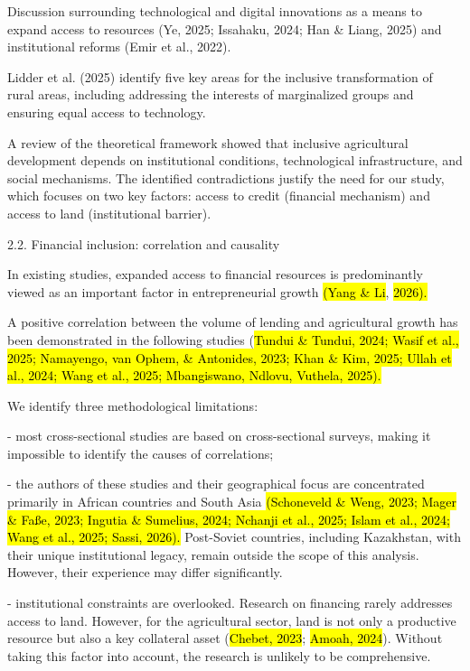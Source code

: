 Discussion surrounding technological and digital innovations as a means
to expand access to resources (Ye, 2025; Issahaku, 2024; Han \& Liang,
2025) and institutional reforms (Emir et al., 2022).

Lidder et al. (2025) identify five key areas for the inclusive
transformation of rural areas, including addressing the interests of
marginalized groups and ensuring equal access to technology.

A review of the theoretical framework showed that inclusive agricultural
development depends on institutional conditions, technological
infrastructure, and social mechanisms. The identified contradictions
justify the need for our study, which focuses on two key factors: access
to credit (financial mechanism) and access to land (institutional
barrier).

2.2. Financial inclusion: correlation and causality

In existing studies, expanded access to financial resources is
predominantly viewed as an important factor in entrepreneurial growth
\hl{(Yang \& Li}, \hl{2026).}

A positive correlation between the volume of lending and agricultural
growth has been demonstrated in the following studies (\hl{Tundui \&
Tundui, 2024; Wasif et al., 2025; Namayengo, van Ophem, \& Antonides,
2023; Khan \& Kim, 2025; Ullah et al., 2024; Wang et al., 2025;
Mbangiswano, Ndlovu, Vuthela, 2025).}

We identify three methodological limitations:

- most cross-sectional studies are based on cross-sectional surveys,
making it impossible to identify the causes of correlations;

- the authors of these studies and their geographical focus are
concentrated primarily in African countries and South Asia
\hl{(Schoneveld \& Weng, 2023; Mager \& Faße, 2023; Ingutia \& Sumelius,
2024; Nchanji et al., 2025; Islam et al., 2024; Wang et al., 2025;
Sassi, 2026).} Post-Soviet countries, including Kazakhstan, with their
unique institutional legacy, remain outside the scope of this analysis.
However, their experience may differ significantly.

- institutional constraints are overlooked. Research on financing rarely
addresses access to land. However, for the agricultural sector, land is
not only a productive resource but also a key collateral asset
(\hl{Chebet, 2023}; \hl{Amoah, 2024}). Without taking this factor into
account, the research is unlikely to be comprehensive.

